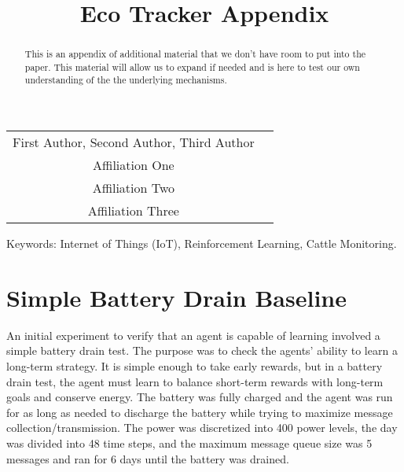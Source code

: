 \documentclass[10pt]{cai}
\begin{document}
\def\conferenceyear{2025}
\begin{center}

\title{Eco Tracker Appendix}
\maketitle

\thispagestyle{empty}

\begin{tabular}{cc}
First Author\upstairs{\affilone,*}, Second Author\upstairs{\affilone}, Third Author\upstairs{\affilthree}
\\[0.25ex]
{\small \upstairs{\affilone} Affiliation One} \\
{\small \upstairs{\affiltwo} Affiliation Two} \\
{\small \upstairs{\affilthree} Affiliation Three} \\
\end{tabular}
  
\vspace*{0.2in}
\end{center}

\begin{abstract}
This is an appendix of additional material that we don't have room to put into the paper.
This material will allow us to expand if needed and is here to test our own understanding of the the underlying mechanisms.


\end{abstract}

\begin{keywords}{Keywords:}
Internet of Things (IoT), Reinforcement Learning, Cattle Monitoring.
\end{keywords}
\copyrightnotice

\section{Simple Battery Drain Baseline}
An initial experiment to verify that an agent is capable of learning involved a simple battery drain test.
The purpose was to check the agents' ability to learn a long-term strategy.
It is simple enough to take early rewards, but in a battery drain test, the agent must learn to balance short-term rewards with long-term goals and conserve energy.
The battery was fully charged and the agent was run for as long as needed to discharge the battery while trying to maximize message collection/transmission.
The power was discretized into 400 power levels, the day was divided into 48 time steps, and the maximum message queue size was 5 messages and ran for 6 days until the battery was drained.
\end{document}
